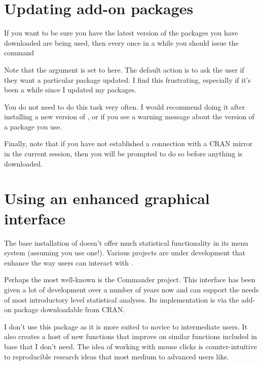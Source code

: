 \section{Updating add-on packages}

If you want to be sure you have the latest version of the packages you have downloaded are being used, then every once in a while you should issue the command
\begin{knitrout}
\color{fgcolor}\begin{kframe}
\begin{alltt}
\hlstd{> }\hlstd{(}\hlstd{=}\hlstd{)}
\end{alltt}
\end{kframe}
\end{knitrout}
Note that the  argument is set to  here. The default action is to ask the user if they want a particular package updated. I find this frustrating, especially if it's been a while since I updated my packages.

You do not need to do this task very often. I would recommend doing it after installing a new version of \R{}, or if you see a warning message about the version of a package you use.

Finally, note that if you have not established a connection with a CRAN mirror in the current \R{} session, then you will be prompted to do so before anything is downloaded.

\section{Using an enhanced graphical interface}

The base installation of \R{} doesn't offer much statistical functionality in its menu system (assuming you use one!). Various projects are under development that enhance the way users can interact with \R{}.

Perhaps the most well-known is the \R{} Commander project. This interface has been given a lot of development over a number of years now and can support the needs of most introductory level statistical analyses. Its implementation is via the  add-on package downloadable from CRAN.

I don't use this package as it is more suited to novice to intermediate \R{} users. It also creates a host of new functions that improve on similar functions included in base \R{} that I don't need. The idea of working with mouse clicks is counter-intuitive to reproducible research ideas that most medium to advanced \R{} users like.

